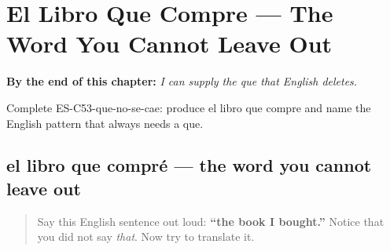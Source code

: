
\chapter{El Libro Que Compre --- The Word You Cannot Leave Out}
\label{ch:relative-obligatory}

\begin{chapteropening}
\textbf{By the end of this chapter:} \emph{I can supply the que that English deletes.}

Complete ES-C53-que-no-se-cae: produce el libro que compre and name the English pattern that always needs a que.
\end{chapteropening}

\section[el libro que compré]{el libro que compré — the word you cannot leave out}

\label{lesson:ES-C53-que-no-se-cae}



\begin{quote}
Say this English sentence out loud: \textbf{\textquotedblleft{}the book I bought.\textquotedblright{}} Notice that you did not say \emph{that}. Now try to translate it.
\end{quote}

